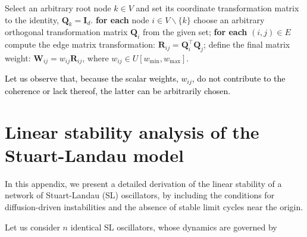 \documentclass[aps,showpacs,preprintnumbers,amsmath,amssymb,twocolumn,superscriptaddress,floatfix,nofootinbib,10pt,pre]{revtex4-1}
\begin{document}
\begin{algorithm*}
\DontPrintSemicolon
{}
\quad Select an arbitrary root node $k\in V$ and set its coordinate transformation matrix to the identity, $\mathbf Q_k = \mathbf I_d$.\;
\qquad \textbf{for each} node $i \in V\backslash\{k\}$
choose an arbitrary orthogonal transformation matrix $\mathbf Q_i$ from the given set;\;
\qquad \textbf{for each}  $(i, j) \in E$ compute the edge matrix transformation: $\mathbf R_{ij} = \mathbf Q_i^\top \mathbf Q_j$;\;
\qquad define the final matrix weight: $\mathbf W_{ij} = w_{ij}\mathbf R_{ij}$, where $w_{ij}\in U[w_{\min},w_{\max}]$.\;
\caption{\label{alg:coherent_mwn} \textcolor{black}{\textbf{Algorithmic procedure for constructing a coherent MWN.} Algorithmic procedure for constructing a coherent MWN of arbitrary size and with an arbitrary underlying undirected topology.}}
\end{algorithm*}

\textcolor{black}{Let us observe that, because the scalar weights, $w_{ij}$, do not contribute to the coherence or lack thereof, the latter can be arbitrarily chosen.}

\section{Linear stability analysis of the Stuart-Landau model}\label{app:SL}

In this appendix, we present a detailed derivation of the linear stability of a network of Stuart-Landau (SL) oscillators, by including the conditions for diffusion-driven instabilities and the absence of stable limit cycles near the origin.

Let us consider $n$ identical SL oscillators, whose dynamics are governed by
\end{document}
